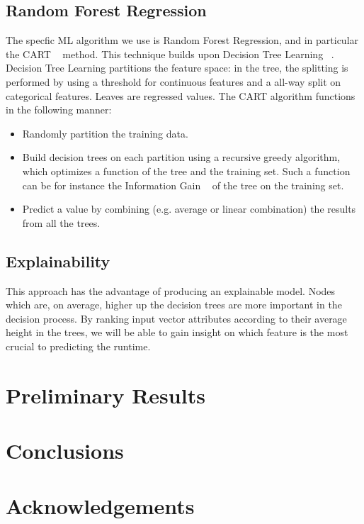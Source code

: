 \documentclass{article}
\begin{document}
\subsection{Random Forest Regression}
\label{sub:random_forests}
The specfic ML algorithm we use is Random Forest Regression, and in particular the CART ~\cite{randomforest} method. This technique builds upon Decision Tree Learning ~\cite{decisiontree}.
Decision Tree Learning partitions the feature space: in the tree, the splitting is performed by using a threshold for continuous features and a all-way split on categorical features. Leaves are regressed values.
The CART algorithm functions in the following manner:
\begin{itemize}
  \item Randomly partition the training data.
  \item Build decision trees on each partition using a recursive greedy algorithm, which optimizes a function of the tree and the training set. Such a function can be for instance the Information Gain ~\cite{kullback} of the tree on the training set.
  \item Predict a value by combining (e.g. average or linear combination) the results from all the trees.
\end{itemize}

\subsection{Explainability}
\label{sub:explainability}
This approach has the advantage of producing an explainable model.
Nodes which are, on average, higher up the decision trees are more important in the decision process.
By ranking input vector attributes according to their average height in the trees, we will be able to gain insight on which feature is the most crucial to predicting the runtime.


\section{Preliminary Results}
\label{sec:preliminary_results}




\section{Conclusions}
\label{sec:conclusions}




\section{Acknowledgements}
\label{sec:conclusions}





\end{document}
